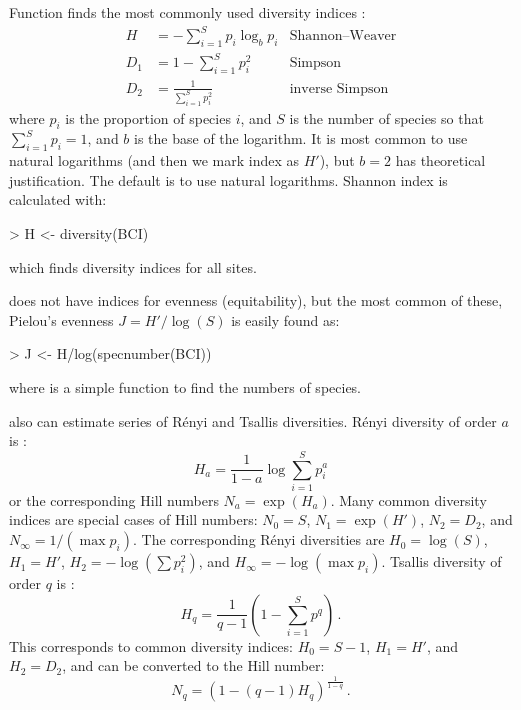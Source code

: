 \documentclass[a4paper,10pt,twocolumn]{article}
\begin{document}
Function  finds the most commonly used diversity
indices \citep{Hill73number}:
\begin{align}
H &= - \sum_{i=1}^S p_i \log_b  p_i & \text{Shannon--Weaver}\\
D_1 &= 1 - \sum_{i=1}^S p_i^2  &\text{Simpson}\\
D_2 &= \frac{1}{\sum_{i=1}^S p_i^2}  &\text{inverse Simpson}
\end{align}
where $p_i$ is the proportion of species $i$, and $S$ is the number of
species so that $\sum_{i=1}^S p_i = 1$, and $b$ is the base of the
logarithm.  It is most common to use natural logarithms (and then we
mark index as $H'$), but $b=2$ has
theoretical justification. The default is to use natural logarithms.
Shannon index is calculated with:
\begin{Schunk}
\begin{Sinput}
> H <- diversity(BCI)
\end{Sinput}
\end{Schunk}
which finds diversity indices for all sites.

 does not have indices for evenness (equitability), but
the most common of these, Pielou's evenness $J = H'/\log(S)$ is easily
found as:
\begin{Schunk}
\begin{Sinput}
> J <- H/log(specnumber(BCI))
\end{Sinput}
\end{Schunk}
where  is a simple  function to find
the numbers of species.

 also can estimate series of R\'{e}nyi and Tsallis
diversities. R{\'e}nyi diversity of order $a$ is \citep{Hill73number}:
\begin{equation}
H_a = \frac{1}{1-a} \log \sum_{i=1}^S p_i^a
\end{equation}
or the corresponding Hill numbers $N_a = \exp(H_a)$.  Many common
diversity indices are special cases of Hill numbers: $N_0 = S$, $N_1 =
\exp(H')$, $N_2 = D_2$, and $N_\infty = 1/(\max p_i)$. The
corresponding R\'{e}nyi diversities are $H_0 = \log(S)$, $H_1 = H'$, $H_2 =
- \log(\sum p_i^2)$, and $H_\infty = - \log(\max p_i)$.  
Tsallis diversity of order $q$ is \citep{Tothmeresz95}:
\begin{equation}
  H_q = \frac{1}{q-1} \left(1 - \sum_{i=1}^S p^q \right) \, .
\end{equation}
This corresponds to common diversity indices: $H_0 = S-1$, $H_1 = H'$,
and $H_2 = D_2$, and can be converted to the Hill number:
\begin{equation}
  N_q = (1 - (q-1) H_q )^\frac{1}{1-q} \, .
\end{equation}
\end{document}
